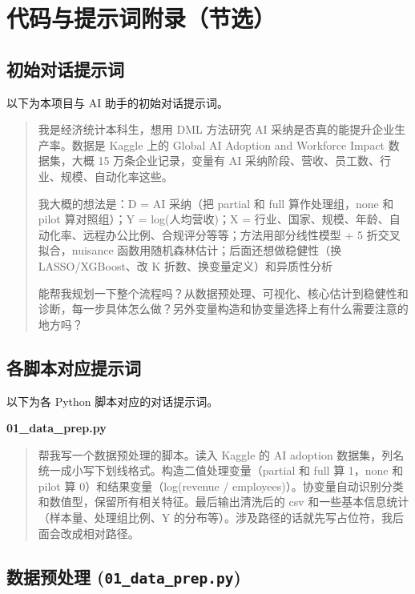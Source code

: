 \section{代码与提示词附录（节选）}\label{sec:appendix}

\subsection{初始对话提示词}

以下为本项目与 AI 助手的初始对话提示词。

\begin{quote}\small
我是经济统计本科生，想用 DML 方法研究 AI 采纳是否真的能提升企业生产率。数据是 Kaggle 上的 Global AI Adoption and Workforce Impact 数据集，大概 15 万条企业记录，变量有 AI 采纳阶段、营收、员工数、行业、规模、自动化率这些。

我大概的想法是：D = AI 采纳（把 partial 和 full 算作处理组，none 和 pilot 算对照组）；Y = log(人均营收)；X = 行业、国家、规模、年龄、自动化率、远程办公比例、合规评分等等；方法用部分线性模型 + 5 折交叉拟合，nuisance 函数用随机森林估计；后面还想做稳健性（换 LASSO/XGBoost、改 K 折数、换变量定义）和异质性分析

\noindent 能帮我规划一下整个流程吗？从数据预处理、可视化、核心估计到稳健性和诊断，每一步具体怎么做？另外变量构造和协变量选择上有什么需要注意的地方吗？
\end{quote}

\subsection{各脚本对应提示词}

以下为各 Python 脚本对应的对话提示词。

\medskip
\noindent\textbf{01\_data\_prep.py}

\begin{quote}\small
帮我写一个数据预处理的脚本。读入 Kaggle 的 AI adoption 数据集，列名统一成小写下划线格式。构造二值处理变量（partial 和 full 算 1，none 和 pilot 算 0）和结果变量（log(revenue / employees)）。协变量自动识别分类和数值型，保留所有相关特征。最后输出清洗后的 csv 和一些基本信息统计（样本量、处理组比例、Y 的分布等）。涉及路径的话就先写占位符，我后面会改成相对路径。
\end{quote}

\subsection{数据预处理 (\texttt{01\_data\_prep.py})}

